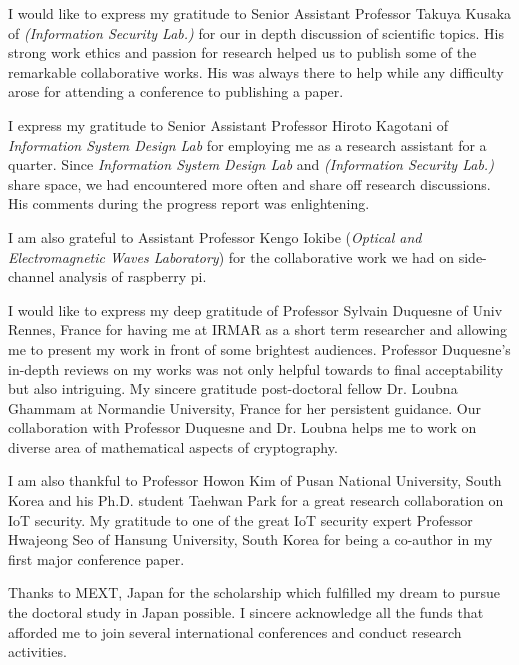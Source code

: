 \documentclass[a4paper]{article}
\begin{document}
\vspace{5pt}
I would like to express my gratitude to Senior Assistant Professor Takuya Kusaka of \textit{(Information Security Lab.)} for our in depth discussion of  scientific topics.
His strong work ethics and passion for research helped us to publish some of the remarkable collaborative works. 
His was always there to help  while any difficulty arose for attending a conference to publishing a paper.  

\vspace{5pt}
I express my gratitude to Senior Assistant Professor Hiroto Kagotani of \textit{Information System Design Lab} for employing me as a research assistant for a quarter. 
Since \textit{Information System Design Lab} and \textit{(Information Security Lab.)} share space, we had encountered more often and share off research discussions.
His comments during the progress report was enlightening.

\vspace{5pt}
I am also grateful to Assistant Professor Kengo Iokibe (\textit{Optical and Electromagnetic Waves Laboratory}) for the collaborative work we had on side-channel analysis of raspberry pi.

\vspace{5pt}
I would like to express my deep gratitude of Professor Sylvain Duquesne of  Univ  Rennes, France for having me at IRMAR as a short term researcher and allowing me to present my work in front of some brightest audiences.
Professor Duquesne's in-depth reviews on my works was not only helpful towards to final acceptability but also intriguing.   
My sincere gratitude post-doctoral fellow Dr. Loubna Ghammam at Normandie University, France for her persistent guidance.
Our collaboration with  Professor Duquesne and Dr. Loubna helps me to work on diverse area of mathematical aspects of cryptography.

\vspace{5pt}
I am also thankful to Professor Howon Kim of Pusan National University, South Korea and his Ph.D. student Taehwan Park for  a great research collaboration on IoT security.
My gratitude to one of the great IoT security expert Professor Hwajeong Seo of Hansung University, South Korea for being a co-author in my first major conference paper.

\vspace{5pt}
Thanks to MEXT, Japan  for the scholarship which fulfilled my dream to pursue the  doctoral study in Japan possible.
I sincere acknowledge all the funds that afforded me to join several international conferences and conduct research activities.
\end{document}
